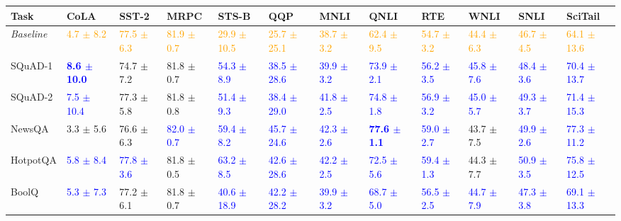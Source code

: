 \begin{landscape}
\begin{table}[t]
\centering
\begin{adjustbox}{max width=2\textwidth}
\begin{tabular}{ l l l l l  l l l l  l l l }
\toprule
\textbf{Task} & CoLA & SST-2 & MRPC & STS-B & QQP & MNLI & QNLI & RTE & WNLI & SNLI & SciTail \\
\midrule
\emph{Baseline} & \textcolor{orange}{4.7 $\pm$ 8.2} & \textcolor{orange}{77.5 $\pm$ 6.3} & \textcolor{orange}{81.9 $\pm$ 0.7} & \textcolor{orange}{29.9 $\pm$ 10.5} & \textcolor{orange}{25.7 $\pm$ 25.1} & \textcolor{orange}{38.7 $\pm$ 3.2} & \textcolor{orange}{62.4 $\pm$ 9.5} & \textcolor{orange}{54.7 $\pm$ 3.2} & \textcolor{orange}{44.4 $\pm$ 6.3} & \textcolor{orange}{46.7 $\pm$ 4.5} & \textcolor{orange}{64.1 $\pm$ 13.6}\\
SQuAD-1 & \textbf{\textcolor{blue}{8.6 $\pm$ 10.0}} & 74.7 $\pm$ 7.2 & 81.8 $\pm$ 0.7 & \textcolor{blue}{54.3 $\pm$ 8.9} & \textcolor{blue}{38.5 $\pm$ 28.6} & \textcolor{blue}{39.9 $\pm$ 3.2} & \textcolor{blue}{73.9 $\pm$ 2.1} & \textcolor{blue}{56.2 $\pm$ 3.5} & \textcolor{blue}{45.8 $\pm$ 7.6} & \textcolor{blue}{48.4 $\pm$ 3.6} & \textcolor{blue}{70.4 $\pm$ 13.7}\\
SQuAD-2 & \textcolor{blue}{7.5 $\pm$ 10.4} & 77.3 $\pm$ 5.8 & 81.8 $\pm$ 0.8 & \textcolor{blue}{51.4 $\pm$ 9.3} & \textcolor{blue}{38.4 $\pm$ 29.0} & \textcolor{blue}{41.8 $\pm$ 2.5} & \textcolor{blue}{74.8 $\pm$ 1.8} & \textcolor{blue}{56.9 $\pm$ 3.2} & \textcolor{blue}{45.0 $\pm$ 5.7} & \textcolor{blue}{49.3 $\pm$ 3.7} & \textcolor{blue}{71.4 $\pm$ 15.3}\\
NewsQA & 3.3 $\pm$ 5.6 & 76.6 $\pm$ 6.3 & \textcolor{blue}{82.0 $\pm$ 0.7} & \textcolor{blue}{59.4 $\pm$ 8.2} & \textcolor{blue}{45.7 $\pm$ 24.6} & \textcolor{blue}{42.3 $\pm$ 2.6} & \textbf{\textcolor{blue}{77.6 $\pm$ 1.1}} & \textcolor{blue}{59.0 $\pm$ 2.7} & 43.7 $\pm$ 7.5 & \textcolor{blue}{49.9 $\pm$ 2.6} & \textcolor{blue}{77.3 $\pm$ 11.2}\\
HotpotQA & \textcolor{blue}{5.8 $\pm$ 8.4} & \textcolor{blue}{77.8 $\pm$ 3.6} & 81.8 $\pm$ 0.5 & \textcolor{blue}{63.2 $\pm$ 8.5} & \textcolor{blue}{42.6 $\pm$ 28.6} & \textcolor{blue}{42.2 $\pm$ 2.5} & \textcolor{blue}{72.5 $\pm$ 5.6} & \textcolor{blue}{59.4 $\pm$ 1.3} & 44.3 $\pm$ 7.7 & \textcolor{blue}{50.9 $\pm$ 3.5} & \textcolor{blue}{75.8 $\pm$ 12.5}\\
BoolQ & \textcolor{blue}{5.3 $\pm$ 7.3} & 77.2 $\pm$ 6.1 & 81.8 $\pm$ 0.7 & \textcolor{blue}{40.6 $\pm$ 18.9} & \textcolor{blue}{42.2 $\pm$ 28.2} & \textcolor{blue}{39.9 $\pm$ 3.2} & \textcolor{blue}{68.7 $\pm$ 5.0} & \textcolor{blue}{56.5 $\pm$ 2.5} & \textcolor{blue}{44.7 $\pm$ 7.9} & \textcolor{blue}{47.3 $\pm$ 3.8} & \textcolor{blue}{69.1 $\pm$ 13.3}\\

\end{tabular}
\end{adjustbox}
\end{table}
\end{landscape}

